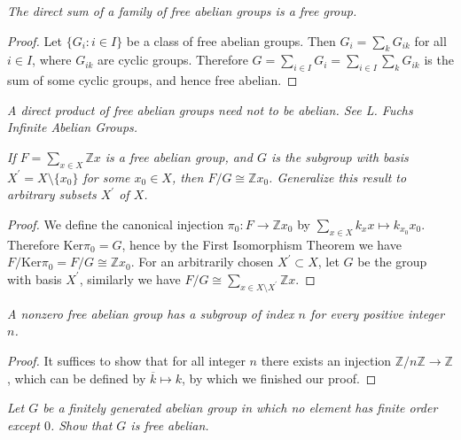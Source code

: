 \begin{problem}\em
The direct sum of a family of free abelian groups is a free group.
\end{problem}
\begin{proof}
Let $\{G_i:i\in I\}$ be a class of free abelian groups. Then $G_i=\sum_{k}G_{ik}$ for all $i\in I$, where $G_{ik}$ are cyclic groups. Therefore $G=\sum_{i\in I}G_i=\sum_{i\in I}\sum_{k}G_{ik}$ is the sum of some cyclic groups, and hence free abelian.
\end{proof}
\begin{note}\em
A direct product of free abelian groups need not to be abelian. See L. Fuchs \textit{Infinite Abelian Groups}.
\end{note}
\begin{problem}\em
If $F=\sum_{x\in X}\mathbb{Z}x$ is a free abelian group, and $G$ is the subgroup with basis $X^\prime=X\setminus\{x_0\}$ for some $x_0\in X$, then $F/G\cong\mathbb{Z}x_0$. Generalize this result to arbitrary subsets $X^\prime$ of $X$.
\end{problem}
\begin{proof}
We define the canonical injection $\pi_0:F\to\mathbb{Z}x_0$ by $\sum_{x\in X}k_xx\mapsto k_{x_0}x_0$. Therefore $\mathrm{Ker}\pi_0=G$, hence by the First Isomorphism Theorem we have $F/\mathrm{Ker}\pi_0=F/G\cong\mathbb{Z}x_0$. For an arbitrarily chosen $X^\prime\subset X$, let $G$ be the group with basis $X^\prime$, similarly we have $F/G\cong\sum_{x\in X\setminus X^\prime}\mathbb{Z}x$.
\end{proof}
\begin{problem}\em
A nonzero free abelian group has a subgroup of index $n$ for every positive integer $n$.
\end{problem}
\begin{proof}
It suffices to show that for all integer $n$ there exists an injection $\mathbb{Z}/n\mathbb{Z}\to\mathbb{Z}$, which can be defined by $\overline{k}\mapsto k$, by which we finished our proof.
\end{proof}
\begin{problem}\em
Let $G$ be a finitely generated abelian group in which no element has finite order except $0$. Show that $G$ is free abelian.
\end{problem}
